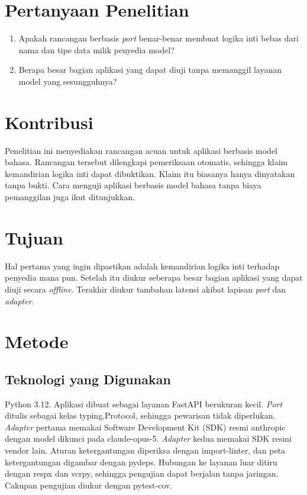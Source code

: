 \documentclass[11pt,a4paper]{article}
\begin{document}
\section{Pertanyaan Penelitian}

\begin{enumerate}[label=\textbf{Pertanyaan \arabic*.}, leftmargin=*, labelsep=0.5em]
  \item Apakah rancangan berbasis \textit{port} benar-benar membuat logika inti bebas dari nama dan tipe data milik penyedia model?
  \item Berapa besar bagian aplikasi yang dapat diuji tanpa memanggil layanan model yang sesungguhnya?
\end{enumerate}

\section{Kontribusi}

Penelitian ini menyediakan rancangan acuan untuk aplikasi berbasis model bahasa. Rancangan tersebut dilengkapi pemeriksaan otomatis, sehingga klaim kemandirian logika inti dapat dibuktikan. Klaim itu biasanya hanya dinyatakan tanpa bukti. Cara menguji aplikasi berbasis model bahasa tanpa biaya pemanggilan juga ikut ditunjukkan.

\section{Tujuan}

Hal pertama yang ingin dipastikan adalah kemandirian logika inti terhadap penyedia mana pun. Setelah itu diukur seberapa besar bagian aplikasi yang dapat diuji secara \textit{offline}. Terakhir diukur tambahan latensi akibat lapisan \textit{port} dan \textit{adapter}.

\section{Metode}

\subsection{Teknologi yang Digunakan}

Python 3.12. Aplikasi dibuat sebagai layanan FastAPI berukuran kecil. \textit{Port} ditulis sebagai kelas typing.Protocol, sehingga pewarisan tidak diperlukan. \textit{Adapter} pertama memakai Software Development Kit (SDK) resmi anthropic dengan model dikunci pada claude-opus-5. \textit{Adapter} kedua memakai SDK resmi vendor lain. Aturan ketergantungan diperiksa dengan import-linter, dan peta ketergantungan digambar dengan pydeps. Hubungan ke layanan luar ditiru dengan respx dan vcrpy, sehingga pengujian dapat berjalan tanpa jaringan. Cakupan pengujian diukur dengan pytest-cov.
\end{document}
